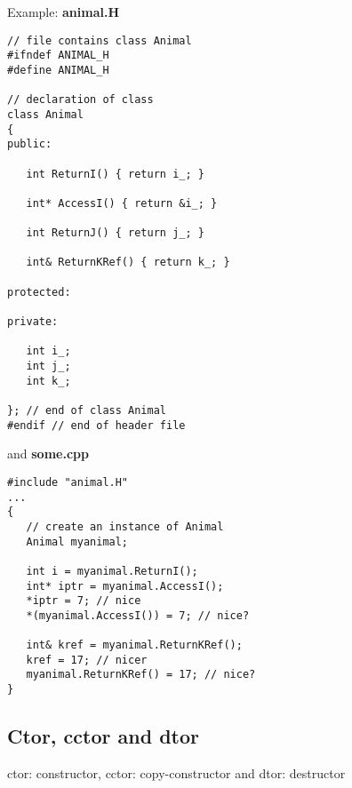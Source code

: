 Example: \textbf{animal.H}\\
\begin{boxedminipage}{\linewidth}
\begin{verbatim}
// file contains class Animal
#ifndef ANIMAL_H
#define ANIMAL_H

// declaration of class
class Animal
{
public:
   
   int ReturnI() { return i_; }

   int* AccessI() { return &i_; }

   int ReturnJ() { return j_; }

   int& ReturnKRef() { return k_; }

protected:

private:

   int i_;
   int j_;
   int k_;
   
}; // end of class Animal
#endif // end of header file
\end{verbatim}
\end{boxedminipage}
and \textbf{some.cpp}\\
\begin{boxedminipage}{\linewidth}
\begin{verbatim}
#include "animal.H"
...
{
   // create an instance of Animal
   Animal myanimal;

   int i = myanimal.ReturnI();
   int* iptr = myanimal.AccessI();
   *iptr = 7; // nice
   *(myanimal.AccessI()) = 7; // nice?

   int& kref = myanimal.ReturnKRef();
   kref = 17; // nicer
   myanimal.ReturnKRef() = 17; // nice?
}
\end{verbatim}
\end{boxedminipage}

\subsection{Ctor, cctor and dtor}
ctor: constructor, cctor: copy-constructor and dtor: destructor

